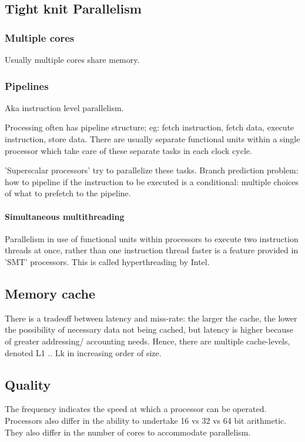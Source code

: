 \documentclass[oneside, article]{memoir}
\begin{document}
\subsection{Tight knit Parallelism}
\subsubsection{Multiple cores}
Usually multiple cores share memory.

\subsubsection{Pipelines}
Aka instruction level parallelism. 

Processing often has pipeline structure; eg: fetch instruction, fetch data, execute instruction, store data. There are usually separate functional units within a single processor which take care of these separate tasks in each clock cycle.

'Superscalar processors' try to parallelize these tasks. Branch prediction problem: how to pipeline if the instruction to be executed is a conditional: multiple choices of what to prefetch to the pipeline.

\paragraph{Simultaneous multithreading}
Parallelism in use of functional units within processors to execute two instruction threads at once, rather than one instruction thread faster is a feature provided in 'SMT' processors. This is called hyperthreading by Intel.

\subsection{Memory cache}
There is a tradeoff between latency and miss-rate: the larger the cache, the lower the possibility of necessary data not being cached, but latency is higher because of greater addressing/ accounting needs. Hence, there are multiple cache-levels, denoted L1 .. Lk in increasing order of size.

\subsection{Quality}
The frequency indicates the speed at which a processor can be operated. Processors also differ in the ability to undertake 16 vs 32 vs 64 bit arithmetic. They also differ in the number of cores to accommodate parallelism.
\end{document}
